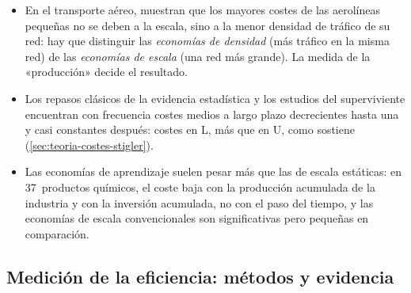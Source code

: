 \documentclass[11pt]{article}
\begin{document}
\begin{itemize}
\begin{itemize}
\begin{itemize}
    \end{itemize}
  \item En el transporte aéreo, \textcite{CavesChristensenTretheway1984Density} muestran que los mayores costes de las aerolíneas pequeñas no se deben a la escala, sino a la menor densidad de tráfico de su red: hay que distinguir las \emph{economías de densidad} (más tráfico en la misma red) de las \emph{economías de escala} (una red más grande). La medida de la «producción» decide el resultado.
  \item Los repasos clásicos de la evidencia estadística\nocite{Johnston1960Statistical,Walters1963Production} y los estudios del superviviente encuentran con frecuencia costes medios a largo plazo decrecientes hasta una  y casi constantes después: costes en L, más que en U, como sostiene  (\ref{sec:teoria-costes-stigler}).
  \item Las economías de aprendizaje suelen pesar más que las de escala estáticas: en 37~productos químicos, el coste baja con la producción acumulada de la industria y con la inversión acumulada, no con el paso del tiempo, y las economías de escala convencionales son significativas pero pequeñas en comparación\nocite{Lieberman1984Learning}.
  \end{itemize}
\end{itemize}

\subsection{Medición de la eficiencia: métodos y evidencia}\label{anexo:empirica-eficiencia}
\end{document}
